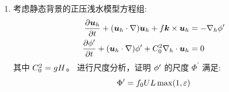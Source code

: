 \begin{enumerate}
\begin{enumerate}
        \item 水平气压梯度力 ($10^1$) 显著大于惯性项 ($10^{-1}$)，这表明压力尺度 $\pressure^\prime$ 反映的是垂直方向上的静力平衡，而非驱动水平运动的有效扰动气压。
    \end{enumerate}

    \textbf{2. 垂直运动方程分析}

    垂直动量方程各项的量级估计如下:
    \begin{equation*}
        \underbrace{\pde{w}{\timevar}}_{\text{局地变化}} + \underbrace{(\vel \cdot \nabla) w}_{\text{平流项}} = - \underbrace{\gravityconst}_{\text{重力}} - \underbrace{\frac{1}{\density} \pde{\pressure^\prime}{z}}_{\text{气压梯度力}}
    \end{equation*}

    \begin{itemize}
        \item 局地变化: $\frac{\vvel}{\timescale} = \frac{10}{10^3} = 10^{-2}\,\mathrm{m/s^2}$；
        \item 平流项: $ \frac{\hvel \vvel}{\hscale} \sim \frac{\vvel^2}{\vscale} = \frac{10 \times 10}{10^3} = 10^{-1}\,\mathrm{m/s^2}$；
        \item 重力: $\gravityconst \approx 10\,\mathrm{m/s^2}$。
        \item 气压梯度力: $\frac{\pressure^\prime}{\density_0 \vscale} = \frac{10^4}{1 \times 10^3} = 10\,\mathrm{m/s^2}$；
    \end{itemize}

    \begin{enumerate}
        \item 垂直气压梯度力与重力同量级 ($10^1$)，且远大于垂直加速度项 ($10^{-1}$)，这表明在微尺度运动中垂直方向上满足静力平衡。
        \item 垂直加速度 ($10^{-1}$) 与水平加速度 ($10^{-1}$) 量级相当，垂直运动不可忽略。
    \end{enumerate}

    \item 考虑静态背景的正压浅水模型方程组:
    \begin{align*}
        \pde{\vel_h}{\timevar} + (\vel_h \cdot \nabla) \vel_h + \coriolis \kvec \times \vel_h &= -\nabla_h \gravpotential^\prime \\
        \pde{\gravpotential^\prime}{\timevar} + (\vel_h \cdot \nabla) \gravpotential^\prime+ C_0^2 \nabla_h \cdot \vel_h &= 0
    \end{align*}
    其中 $C_0^2 = g H$。
    进行尺度分析，证明 $\phi^\prime$ 的尺度 $\Phi^\prime$ 满足:
    \begin{equation*}
        \Phi^\prime = f_0 U L \max(1, \varepsilon)
    \end{equation*}


\end{enumerate}
